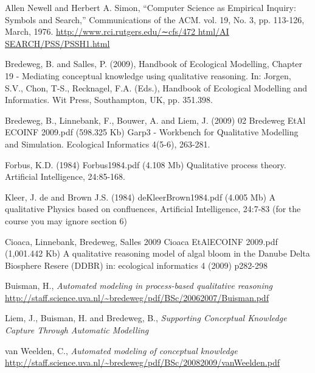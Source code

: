 \documentclass{article}
\begin{document}
\begin{thebibliography}{99}

 Allen Newell and Herbert A. Simon, “Computer Science as Empirical Inquiry: Symbols and Search,” Communications of the ACM. vol. 19, No. 3, pp. 113-126, March, 1976. \url{http://www.rci.rutgers.edu/∼cfs/472 html/AI SEARCH/PSS/PSSH1.html}

 Bredeweg, B. and Salles, P. (2009), Handbook of
Ecological Modelling, Chapter 19 - Mediating conceptual knowledge using
qualitative reasoning. In: J\/orgen, S.V., Chon, T-S., Recknagel, F.A. (Eds.),
Handbook of Ecological Modelling and Informatics. Wit Press, Southampton, UK,
pp. 351.398.

 Bredeweg, B., Linnebank, F., Bouwer, A. and Liem, J.
(2009) 02 Bredeweg EtAl ECOINF 2009.pdf (598.325 Kb) Garp3 - Workbench for
Qualitative Modelling and Simulation. Ecological Informatics 4(5-6), 263-281.

 Forbus, K.D. (1984) Forbus1984.pdf (4.108 Mb) Qualitative
process theory. Artificial Intelligence, 24:85-168. 

 Kleer, J. de and Brown J.S. (1984) deKleerBrown1984.pdf (4.005
Mb) A qualitative Physics based on confluences, Artificial Intelligence,
24:7-83 (for the course you may ignore section 6)

 Cioaca, Linnebank, Bredeweg, Salles 2009 Cioaca EtAlECOINF
2009.pdf (1,001.442 Kb) A qualitative reasoning model of algal bloom in the
Danube Delta Biosphere Resere (DDBR) in: ecological informatics 4 (2009)
p282-298

 Buisman, H., \emph{Automated modeling in process-based
qualitative reasoning}
\url{http://staff.science.uva.nl/~bredeweg/pdf/BSc/20062007/Buisman.pdf}

 Liem, J., Buisman, H. and Bredeweg, B., \emph{Supporting
Conceptual Knowledge Capture Through Automatic Modelling}

 van Weelden, C., \emph{Automated modeling of conceptual
knowledge}
\url{http://staff.science.uva.nl/~bredeweg/pdf/BSc/20082009/vanWeelden.pdf}

\end{thebibliography}
\end{document}

